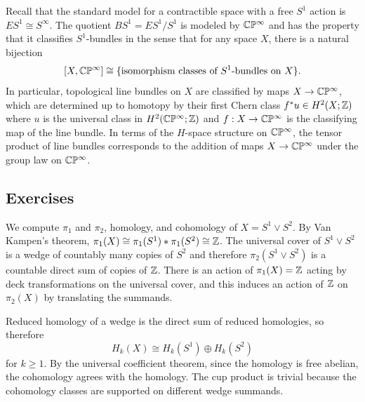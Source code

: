 \documentclass[12pt]{article}
\begin{document}
\begin{example}
    Recall that the standard model for a contractible space with a free $S^1$ action is $ES^1 \cong S^\infty$. The quotient $BS^1 = ES^1/S^1$ is modeled by $\mathbb{C}\mathbb{P}^\infty$ and has the property that it classifies $S^1$-bundles in the sense that for any space $X$, there is a natural bijection
\[[X,\mathbb{C}\mathbb{P}^\infty]\cong \{\text{isomorphism classes of }S^1\text{-bundles on }X\}.\]
In particular, topological line bundles on $X$ are classified by maps $X \to \mathbb{C}\mathbb{P}^\infty$, which are determined up to homotopy by their first Chern class $f^*u \in H^2(X;\mathbb{Z})$ where $u$ is the universal class in $H^2(\mathbb{C}\mathbb{P}^\infty;\mathbb{Z})$ and $f:X\to \mathbb{C}\mathbb{P}^\infty$ is the classifying map of the line bundle. In terms of the $H$-space structure on $\mathbb{C}\mathbb{P}^\infty$, the tensor product of line bundles corresponds to the addition of maps $X \to \mathbb{C}\mathbb{P}^\infty$ under the group law on $\mathbb{C}\mathbb{P}^\infty$.
\end{example}

\subsection{Exercises}
\begin{example}
    We compute $\pi_1$ and $\pi_2$, homology, and cohomology of $X = S^1 \vee S^2$. By Van Kampen's theorem, $\pi_1(X) \cong \pi_1(S^1) * \pi_1(S^2) \cong \mathbb{Z}$. The universal cover of $S^1 \vee S^2$ is a wedge of countably many copies of $S^2$ and therefore $\pi_2(S^1 \vee S^2)$ is a countable direct sum of copies of $\mathbb{Z}$. There is an action of $\pi_1(X) = \mathbb{Z}$ acting by deck transformations on the universal cover, and this induces an action of $\mathbb{Z}$ on $\pi_2(X)$ by translating the summands.

    Reduced homology of a wedge is the direct sum of reduced homologies, so therefore \[H_k(X) \cong H_k(S^1) \oplus H_k(S^2)\] for $k\ge 1$. By the universal coefficient theorem, since the homology is free abelian, the cohomology agrees with the homology. The cup product is trivial because the cohomology classes are supported on different wedge summands.
\end{example}
\end{document}
